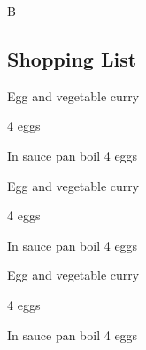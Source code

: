		\begin{menu}{B}
    
    \subsection*{Shopping List}
    
    
    
    
    
    
    
    \clearpage
  
    \begin{recipe}{2}{Egg and vegetable curry}%
    
		\begin{ingredients}
		4  eggs  \\
	
		\end{ingredients}
	
    \begin{instructions}
    \item 
				In sauce pan boil
				4   eggs
    \end{instructions}
    \end{recipe}%
  
    \begin{recipe}{2}{Egg and vegetable curry}%
    
		\begin{ingredients}
		4  eggs  \\
	
		\end{ingredients}
	
    \begin{instructions}
    \item 
				In sauce pan boil
				4   eggs
    \end{instructions}
    \end{recipe}%
  
    \begin{recipe}{2}{Egg and vegetable curry}%
    
		\begin{ingredients}
		4  eggs  \\
	
		\end{ingredients}
	
    \begin{instructions}
    \item 
				In sauce pan boil
				4   eggs
    \end{instructions}
    \end{recipe}%
  
    \clearpage
    \end{menu}
	
	